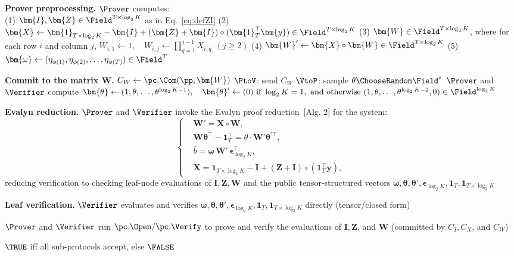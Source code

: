\begin{algorithm}[!t]
\caption{Proof of TBV Evaluation}
\label{alg:tbveval}


\BlankLine
{\bf Prover preprocessing.}
$\Prover$ computes:\\
\Indp
(1) $\bm{I},\bm{Z}\in\Field^{T\times \log_2 K}$ as in Eq.~\eqref{eq:defZI}\;
(2) $\bm{X} \leftarrow \bm{1}_{T\times \log_2 K} - \bm{I} + (\bm{Z}+\bm{I})\circ(\bm{1}_T^\top \bm{y}) \in \Field^{T\times \log_2 K}$\;
(3) $\bm{W}\in\Field^{T\times \log_2 K}$, where for each row $i$ and column $j$,
\(
    W_{i,1} \leftarrow 1,\quad
    W_{i,j} \leftarrow \prod_{q=1}^{j-1} X_{i,q}\ \ (j\ge 2)
\)\;
(4) $\bm{W}' \leftarrow \bm{X}\circ \bm{W} \in \Field^{T\times \log_2 K}$\;
(5) $\bm{\omega} \leftarrow
(\eta_{\phi(1)},\eta_{\phi(2)},\ldots,\eta_{\phi(T)})\in\Field^{T}$\;
\Indm

\BlankLine
{\bf Commit to the matrix $\bm{W}$.}
$C_W \leftarrow \pc.\Com(\pp,\bm{W})$\;
$\PtoV$: send $C_W$\;
$\VtoP$: sample $\theta \ChooseRandom \Field^*$\;
$\Prover$ and $\Verifier$ compute
\(
\bm{\theta} \leftarrow (1,\theta,\ldots,\theta^{\log_2 K-1}),
\quad
\bm{\theta}' \leftarrow (0)\ \text{if }\log_2K=1,\ \text{and otherwise } 
(1,\theta,\ldots,\theta^{\log_2 K-2},0)
\in\Field^{\log_2 K}
\)\;

\BlankLine
{\bf Evalyn reduction.}
$\Prover$ and $\Verifier$ invoke the Evalyn proof reduction~[Alg. 2]\cite{asiaccs/CongYY24} for the system:
\[
\left\{
\begin{aligned}
& \bm{W}' = \bm{X}\circ \bm{W},\\
& \bm{W}\bm{\theta}^\top - \bm{1}_T^\top = \theta\cdot \bm{W}'\bm{\theta}^{'\top},\\
& \bar{b} = \bm{\omega}\,\bm{W}'\,\bm{\epsilon}_{\log_2 K}^\top,\\
& \bm{X} = \bm{1}_{T\times \log_2 K} - \bm{I} + (\bm{Z}+\bm{I})\circ(\bm{1}_T^\top \bm{y}),
\end{aligned}
\right.
\]
reducing verification to checking leaf-node evaluations of
$\bm{I},\bm{Z},\bm{W}$ and the public tensor-structured vectors
$\bm{\omega},\bm{\theta},\bm{\theta}',\bm{\epsilon}_{\log_2 K},\bm{1}_T,\bm{1}_{T\times \log_2 K}$\;

\BlankLine
{\bf Leaf verification.}
$\Verifier$ evaluates and verifies
$\bm{\omega},\bm{\theta},\bm{\theta}',\bm{\epsilon}_{\log_2 K},\bm{1}_T,\bm{1}_{T\times \log_2 K}$ directly (tensor/closed form)\;

$\Prover$ and $\Verifier$ run $\pc.\Open/\pc.\Verify$ to prove and verify the evaluations of $\bm{I},\bm{Z}$, and $\bm{W}$ (committed by $C_I,C_X$, and $C_W$)\;

\BlankLine
\Return $\TRUE$ iff all sub-protocols accept, else \Return $\FALSE$\;
\end{algorithm}
